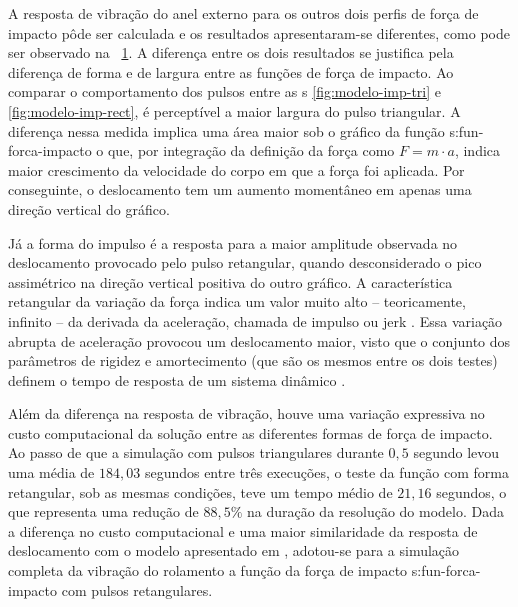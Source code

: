 \documentclass[12pt,oneside,english,brazil,lmodern,siglas,simbolos,cite=num]{ucsmonograph}
\begin{document}
	A resposta de vibração do anel externo para os outros dois perfis de força de impacto pôde ser calculada e os resultados apresentaram-se diferentes, como pode ser observado na \figurename\ \ref{fig:modelo-comp-pulsos}.
	A diferença entre os dois resultados se justifica pela diferença de forma e de largura entre as funções de força de impacto.
	Ao comparar o comportamento dos pulsos entre as {\figurename s} \ref{fig:modelo-imp-tri} e \ref{fig:modelo-imp-rect}, é perceptível a maior largura do pulso triangular.
	A diferença nessa medida implica uma área maior sob o gráfico da função \gls{s:fun-forca-impacto} o que, por integração da definição da força como $F = m\cdot a$, indica maior crescimento da velocidade do corpo em que a força foi aplicada.
	Por conseguinte, o deslocamento tem um aumento momentâneo em apenas uma direção vertical do gráfico.
	
	\begin{figure}[b]
		\label{fig:modelo-comp-pulsos}
	\end{figure}

	Já a forma do impulso é a resposta para a maior amplitude observada no deslocamento provocado pelo pulso retangular, quando desconsiderado o pico assimétrico na direção vertical positiva do outro gráfico.
	A característica retangular da variação da força indica um valor muito alto -- teoricamente, infinito -- da derivada da aceleração, chamada de impulso ou \foreignlanguage{english}{jerk} \cite{norton:2010}.
	Essa variação abrupta de aceleração provocou um deslocamento maior, visto que o conjunto dos parâmetros de rigidez e amortecimento (que são os mesmos entre os dois testes) definem o tempo de resposta de um sistema dinâmico \cite{lutz:2005}.
	
	Além da diferença na resposta de vibração, houve uma variação expressiva no custo computacional da solução entre as diferentes formas de força de impacto.
	Ao passo de que a simulação com pulsos triangulares durante $0,5$ segundo levou uma média de $184,03$ segundos entre três execuções, o teste da função com forma retangular, sob as mesmas condições, teve um tempo médio de $21,16$ segundos, o que representa uma redução de $88,5\%$ na duração da resolução do modelo.
	Dada a diferença no custo computacional e uma maior similaridade da resposta de deslocamento com o modelo apresentado em \cite{sassi:2007}, adotou-se para a simulação completa da vibração do rolamento a função da força de impacto \gls{s:fun-forca-impacto} com pulsos retangulares.
\end{document}
